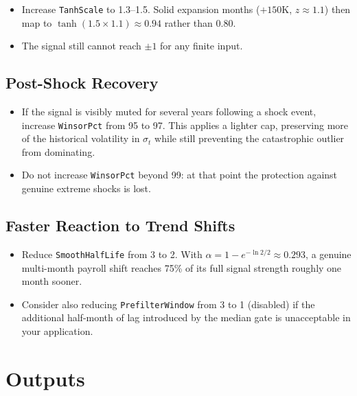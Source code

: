\documentclass[11pt, a4paper]{article}
\begin{document}
\begin{itemize}[leftmargin=2em]
  \item Increase \texttt{TanhScale} to 1.3--1.5. Solid expansion
        months ($+150$K, $z \approx 1.1$) then map to
        $\tanh(1.5 \times 1.1) \approx 0.94$ rather than $0.80$.
  \item The signal still cannot reach $\pm 1$ for any finite input.
\end{itemize}

\subsection{Post-Shock Recovery}

\begin{itemize}[leftmargin=2em]
  \item If the signal is visibly muted for several years following a
        shock event, increase \texttt{WinsorPct} from 95 to 97.
        This applies a lighter cap, preserving more of the historical
        volatility in $\sigma_t$ while still preventing the catastrophic
        outlier from dominating.
  \item Do not increase \texttt{WinsorPct} beyond 99: at that point
        the protection against genuine extreme shocks is lost.
\end{itemize}

\subsection{Faster Reaction to Trend Shifts}

\begin{itemize}[leftmargin=2em]
  \item Reduce \texttt{SmoothHalfLife} from 3 to 2. With
        $\alpha = 1 - e^{-\ln2/2} \approx 0.293$, a genuine
        multi-month payroll shift reaches 75\% of its full signal
        strength roughly one month sooner.
  \item Consider also reducing \texttt{PrefilterWindow} from 3 to 1
        (disabled) if the additional half-month of lag introduced by
        the median gate is unacceptable in your application.
\end{itemize}

\section{Outputs}
\label{sec:outputs}
\end{document}
